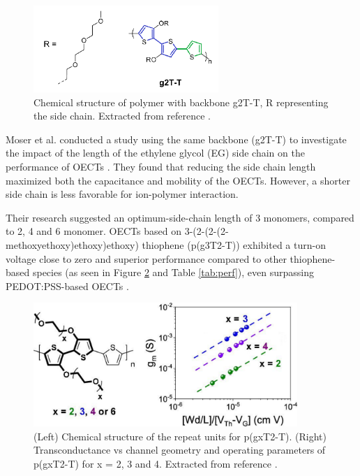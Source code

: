 \begin{figure}[ht]
	\centering
	\includegraphics[width=7cm]{Images/pdf/g2T-T.pdf}
	\caption[Chemical structure of polymer g2T-T]{Chemical structure of polymer with backbone g2T-T, R representing the side chain. Extracted from reference \cite{nielsenMolecularDesignSemiconducting2016}.}
	\label{fig:g2TT}
\end{figure}

Moser et al. conducted a study using the same backbone (g2T-T) to investigate the impact of the length of the ethylene glycol (EG) side chain on the performance of OECTs 
\cite{moserEthyleneGlycolBasedSide2020}. They found that reducing the side chain length maximized both the capacitance and mobility of the OECTs. However, a shorter side chain is less favorable for ion-polymer interaction. 

Their research suggested an optimum-side-chain length of 3 monomers, compared to 2, 4 and 6 monomer. OECTs based on 3-(2-(2-(2-methoxyethoxy)ethoxy)ethoxy) thiophene (p(g3T2-T)) exhibited a turn-on voltage close to zero and superior performance compared to other thiophene-based species (as seen in Figure \ref{fig:pg3t} and Table \ref{tab:perf}), even surpassing PEDOT:PSS-based OECTs \cite{inalBenchmarkingOrganicMixed2017}. %

\begin{figure}[ht]
	\centering
	\includegraphics[width=10cm]{Images/pdf/pg3t+perf.pdf}
	\caption[Chemical structure and transconductance of g2T-T with side-chain engineering]{(Left) Chemical structure of the repeat units for p(gxT2-T). (Right) Transconductance vs channel geometry and operating parameters of p(gxT2-T) for x = 2, 3 and 4. Extracted from reference \cite{moserEthyleneGlycolBasedSide2020}.}
	\label{fig:pg3t}
\end{figure}

